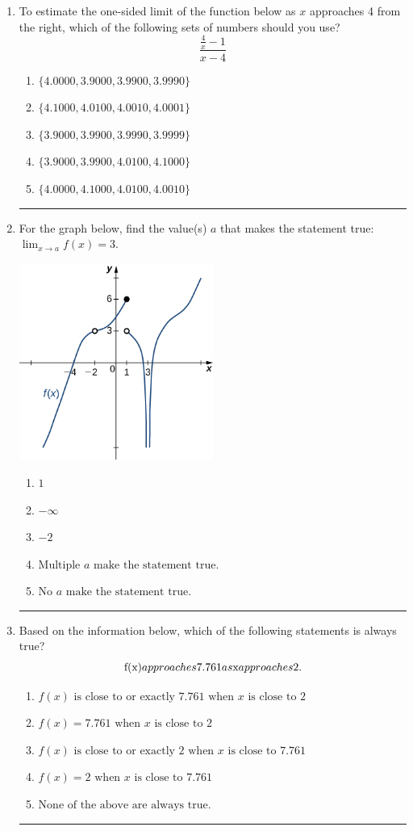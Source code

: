 \documentclass[14pt]{extbook}
\newcommand{\litem}[1]{\item#1\hspace*{-1cm}\rule{\textwidth}{0.4pt}}
\begin{document}
\begin{enumerate}
{\begin{enumerate}[label=\Alph*.]
\end{enumerate} }
\litem{
To estimate the one-sided limit of the function below as $x$ approaches 4 from the right, which of the following sets of numbers should you use?\[ \frac{\frac{4}{x} - 1}{x - 4} \]\begin{enumerate}[label=\Alph*.]
\item \( \{ 4.0000, 3.9000, 3.9900, 3.9990 \} \)
\item \( \{ 4.1000, 4.0100, 4.0010, 4.0001 \} \)
\item \( \{ 3.9000, 3.9900, 3.9990, 3.9999 \} \)
\item \( \{ 3.9000, 3.9900, 4.0100, 4.1000 \} \)
\item \( \{ 4.0000, 4.1000, 4.0100, 4.0010 \} \)

\end{enumerate} }
\litem{
For the graph below, find the value(s) $a$ that makes the statement true: $ \displaystyle \lim_{x \rightarrow a} f(x) = 3$.
\begin{center}
    \includegraphics[width=0.5\textwidth]{../Figures/evaluateLimitGraphicallyCopyB.png}
\end{center}
\begin{enumerate}[label=\Alph*.]
\item \( 1 \)
\item \( -\infty \)
\item \( -2 \)
\item \( \text{Multiple } a \text{ make the statement true}. \)
\item \( \text{No } a \text{ make the statement true}. \)

\end{enumerate} }
\litem{
Based on the information below, which of the following statements is always true?\[ $f(x)$ approaches $7.761$ as $x$ approaches $2$. \]\begin{enumerate}[label=\Alph*.]
\item \( f(x) \text{ is close to or exactly } 7.761 \text{ when } x \text{ is close to } 2 \)
\item \( f(x) = 7.761 \text{ when } x \text{ is close to } 2 \)
\item \( f(x) \text{ is close to or exactly } 2 \text{ when } x \text{ is close to } 7.761 \)
\item \( f(x) = 2 \text{ when } x \text{ is close to } 7.761 \)
\item \( \text{None of the above are always true.} \)


\end{enumerate}}
\end{enumerate}
\end{document}
